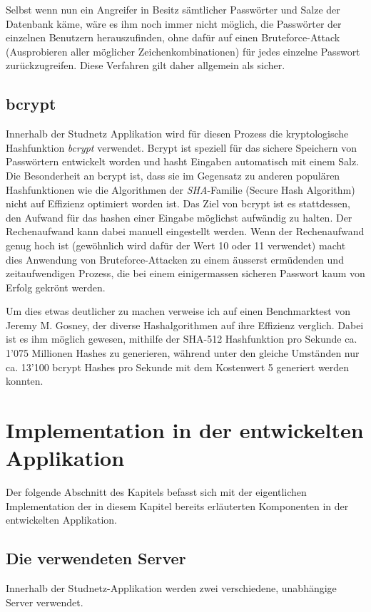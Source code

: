 \documentclass[../main.tex]{subfiles}
\begin{document}
	Selbst wenn nun ein Angreifer in Besitz sämtlicher Passwörter und Salze der Datenbank käme, wäre es ihm noch immer nicht möglich, die Passwörter der einzelnen Benutzern herauszufinden, ohne dafür auf einen Bruteforce-Attack (Ausprobieren aller möglicher Zeichenkombinationen) für jedes einzelne Passwort zurückzugreifen. Diese Verfahren gilt daher allgemein als sicher. \cite{defuse} \cite{security}
	
	\subsection{bcrypt}
	Innerhalb der Studnetz Applikation wird für diesen Prozess die kryptologische Hashfunktion \emph{bcrypt} verwendet. Bcrypt ist speziell für das sichere Speichern von Passwörtern entwickelt worden und hasht Eingaben automatisch mit einem Salz. Die Besonderheit an bcrypt ist, dass sie im Gegensatz zu anderen populären Hashfunktionen wie die Algorithmen der \emph{SHA}-Familie (Secure Hash Algorithm) nicht auf Effizienz optimiert worden ist. Das Ziel von bcrypt ist es stattdessen, den Aufwand für das hashen einer Eingabe möglichst aufwändig zu halten. Der Rechenaufwand kann dabei manuell eingestellt werden. Wenn der Rechenaufwand genug hoch ist (gewöhnlich wird dafür der Wert 10 oder 11 verwendet) macht dies Anwendung von Bruteforce-Attacken zu einem äusserst ermüdenden und zeitaufwendigen Prozess, die bei einem einigermassen sicheren Passwort kaum von Erfolg gekrönt werden. \cite{bcrypt}
	
	Um dies etwas deutlicher zu machen verweise ich auf einen Benchmarktest von Jeremy M. Gosney, der diverse Hashalgorithmen auf ihre Effizienz verglich. Dabei ist es ihm möglich gewesen, mithilfe der SHA-512 Hashfunktion pro Sekunde ca. 1'075 Millionen Hashes zu generieren, während unter den gleiche Umständen nur ca. 13'100 bcrypt Hashes pro Sekunde mit dem Kostenwert 5 generiert werden konnten. \cite{benchmark}
	
	\section{Implementation in der entwickelten Applikation}\label{implementationServer}
	Der folgende Abschnitt des Kapitels befasst sich mit der eigentlichen Implementation der in diesem Kapitel bereits erläuterten Komponenten in der entwickelten Applikation.
	
	
	\subsection{Die verwendeten Server}
	Innerhalb der Studnetz-Applikation werden zwei verschiedene, unabhängige Server verwendet.
	
\end{document}

